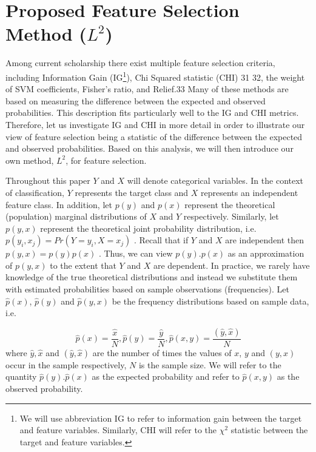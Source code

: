 \documentclass[review]{elsarticle}
\begin{document}
\section{Proposed Feature Selection Method ($ L^2 $)}

Among current scholarship there exist multiple feature selection criteria, including Information Gain (IG\footnote{We will use abbreviation IG to refer to information gain between the target and feature variables. Similarly, CHI will refer to the $ \ensuremath{\chi}^2 $ statistic between the target and feature variables.}), Chi Squared statistic (CHI) 31 32, the  weight of SVM coefficients, Fisher’s ratio, and Relief.33  Many of these methods are based on measuring the difference between the expected and observed probabilities.  This description fits particularly well to the IG and CHI metrics. Therefore, let us investigate IG and CHI in more detail in order to illustrate our view of feature selection being a statistic of the difference between the expected and observed probabilities. Based on this analysis, we will then introduce our own method, $ L^2 $, for feature selection.

Throughout this paper $ Y $ and $ X $ will denote categorical variables. In the context of classification, $ Y $ represents the target class and $ X $ represents an independent feature class. In addition, let $ p(y) $  and $ p(x) $  represent the theoretical (population) marginal distributions of $ X $ and  $ Y $ respectively. Similarly, let $ p(y,x) $  represent the theoretical joint probability distribution, i.e. $ p(y_{i},x_{j}) = Pr(Y = y_{i}, X = x_{j})$ . Recall that if $ Y $ and $ X $ are independent then $ p(y, x) = p(y) p(x) $ . Thus, we can view $ p(y). p(x) $ as an approximation of $ p(y, x) $  to the extent that $ Y $ and $ X $ are dependent. In practice, we rarely have knowledge of the true theoretical distributions and instead we substitute them with estimated probabilities based on sample observations (frequencies). Let $ \hat{p}(x) $, $ \hat{p}(y) $ and $ \hat{p}(y,x) $ be the frequency distributions based on sample data, i.e.

\[ 
 \hat{p}(x) = \frac{\hat{x}}{N} ,  \hat{p}(y) = \frac{\hat{y}}{N} ,  \hat{p}(x,y)= \frac {(\hat{y}, \hat{x})}{ N}
 \]
 where $ \hat{y}, \hat{x} $ and $ (\hat{y}, \hat{x}) $ are the number of times the values of $ x $, $ y $ and $ (y, x) $ occur in the sample respectively, $ N $ is the sample size. We will refer to the quantity $ \hat{p}(y).\hat{p}(x) $ as the expected probability and refer to $ \hat{p}(x,y) $ as the observed probability.
\end{document}
